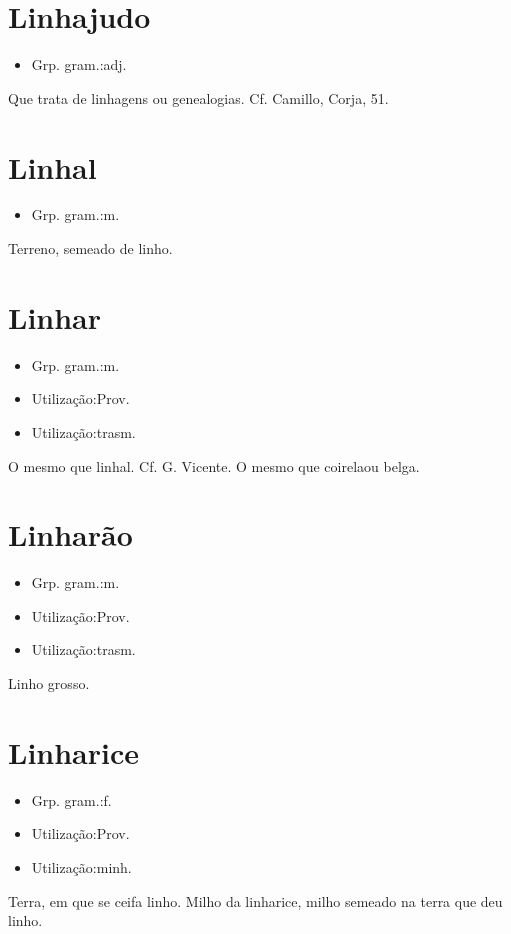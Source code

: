 \section{Linhajudo}
\begin{itemize}
\item {Grp. gram.:adj.}
\end{itemize}
Que trata de linhagens ou genealogias. Cf. Camillo, \textunderscore Corja\textunderscore , 51.
\section{Linhal}
\begin{itemize}
\item {Grp. gram.:m.}
\end{itemize}
Terreno, semeado de linho.
\section{Linhar}
\begin{itemize}
\item {Grp. gram.:m.}
\end{itemize}
\begin{itemize}
\item {Utilização:Prov.}
\end{itemize}
\begin{itemize}
\item {Utilização:trasm.}
\end{itemize}
O mesmo que \textunderscore linhal\textunderscore . Cf. G. Vicente.
O mesmo que \textunderscore coirela\textunderscore  ou \textunderscore belga\textunderscore .
\section{Linharão}
\begin{itemize}
\item {Grp. gram.:m.}
\end{itemize}
\begin{itemize}
\item {Utilização:Prov.}
\end{itemize}
\begin{itemize}
\item {Utilização:trasm.}
\end{itemize}
Linho grosso.
\section{Linharice}
\begin{itemize}
\item {Grp. gram.:f.}
\end{itemize}
\begin{itemize}
\item {Utilização:Prov.}
\end{itemize}
\begin{itemize}
\item {Utilização:minh.}
\end{itemize}
Terra, em que se ceifa linho.
\textunderscore Milho da linharice\textunderscore , milho semeado na terra que deu linho.
